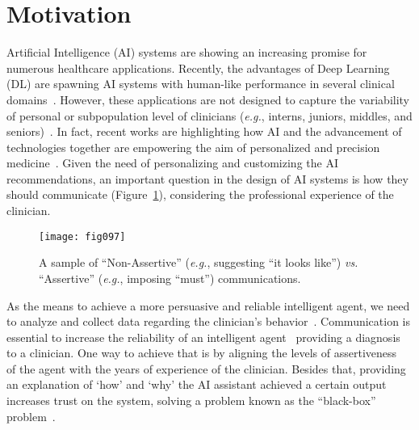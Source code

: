 \clearpage
\label{chap:chap006}

\section{Motivation}
\label{sec:chap006001}

Artificial Intelligence (AI) systems are showing an increasing promise for numerous healthcare applications.
Recently, the advantages of Deep Learning (DL) are spawning AI systems with human-like performance in several clinical domains~\cite{CALISTO2022102285, Hannun2019, Ruamviboonsuk2019, Stephansen2018}.
However, these applications are not designed to capture the variability of personal or subpopulation level of clinicians ({\it e.g.}, interns, juniors, middles, and seniors)~\cite{Uddin2019}.
In fact, recent works are highlighting how AI and the advancement of technologies together are empowering the aim of personalized and precision medicine~\cite{Subramanian2020, HO2020497, Wetzstein2020}.
Given the need of personalizing and customizing the AI recommendations, an important question in the design of AI systems is how they should communicate (Figure~\ref{fig:fig097}), considering the professional experience of the clinician.

\begin{figure}
\texttt{[image: fig097]}
\caption[]{A sample of ``Non-Assertive'' ({\it e.g.}, suggesting ``it looks like'') {\it vs.} ``Assertive'' ({\it e.g.}, imposing ``must'') communications.}
\label{fig:fig097}
\end{figure}

As the means to achieve a more persuasive and reliable intelligent agent, we need to analyze and collect data regarding the clinician's behavior~\cite{PELAU2021106855}.
Communication is essential to increase the reliability of an intelligent agent~\cite{10.1145/3311350.3347162} providing a diagnosis to a clinician.
One way to achieve that is by aligning the levels of assertiveness~\cite{pacheco2019alignment} of the agent with the years of experience of the clinician.
Besides that, providing an explanation of `how' and `why' the AI assistant achieved a certain output increases trust on the system, solving a problem known as the ``black-box'' problem~\cite{10.1145/3491102.3502104, CALISTO2021102607}.

